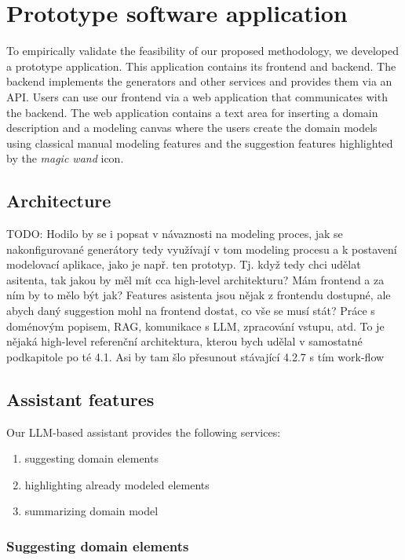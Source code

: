 \chapter{Prototype software application}

To empirically validate the feasibility of our proposed methodology, we developed a prototype application. This application contains its frontend and backend. The backend implements the generators and other services and provides them via an API. Users can use our frontend via a web application that communicates with the backend. The web application contains a text area for inserting a domain description and a modeling canvas where the users create the domain models using classical manual modeling features and the suggestion features highlighted by the \textit{magic wand} icon.


\section{Architecture}

\noindent{}TODO: Hodilo by se i popsat v návaznosti na modeling proces, jak se nakonfigurované generátory tedy využívají v tom modeling procesu a k postavení modelovací aplikace, jako je např. ten prototyp. Tj. když tedy chci udělat asitenta, tak jakou by měl mít cca high-level architekturu? Mám frontend a za ním by to mělo být jak? Features asistenta jsou nějak z frontendu dostupné, ale abych daný suggestion mohl na frontend dostat, co vše se musí stát? Práce s doménovým popisem, RAG, komunikace s LLM, zpracování vstupu, atd. To je nějaká high-level referenční architektura, kterou bych udělal v samostatné podkapitole po té 4.1. Asi by tam šlo přesunout stávající 4.2.7 s tím work-flow


\section{Assistant features}

Our LLM-based assistant provides the following services:

\begin{enumerate}
\item suggesting domain elements
\item highlighting already modeled elements
\item summarizing domain model
\end{enumerate}


\subsection{Suggesting domain elements}

